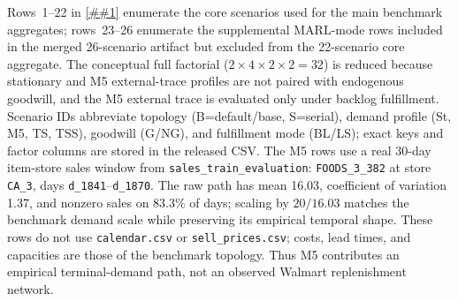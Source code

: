 \documentclass[10pt,a4paper]{article}
\providecommand{\Cref}[1]{\ref{##1}}
\begin{document}
Rows~1--22 in \Cref{tab:full_scenarios} enumerate the core scenarios used
for the main benchmark aggregates; rows~23--26 enumerate the supplemental
MARL-mode rows included in the merged 26-scenario artifact but excluded
from the 22-scenario core aggregate. The conceptual full factorial
($2 \times 4 \times 2 \times 2 = 32$) is reduced because stationary
and M5 external-trace profiles are not paired with endogenous goodwill, and the
M5 external trace is evaluated only under backlog fulfillment. Scenario
IDs abbreviate topology (B=default/base, S=serial), demand profile
(St, M5, TS, TSS), goodwill (G/NG), and fulfillment mode (BL/LS);
exact keys and factor columns are stored in the released CSV.
The M5 rows use a real 30-day item-store sales window from
\texttt{sales\_train\_evaluation}: \texttt{FOODS\_3\_382} at store
\texttt{CA\_3}, days \texttt{d\_1841}--\texttt{d\_1870}. The raw path
has mean 16.03, coefficient of variation 1.37, and nonzero sales on
83.3\% of days; scaling by $20/16.03$ matches the benchmark demand scale
while preserving its empirical temporal shape. These rows do not use
\texttt{calendar.csv} or \texttt{sell\_prices.csv}; costs, lead times,
and capacities are those of the benchmark topology. Thus M5 contributes
an empirical terminal-demand path, not an observed Walmart replenishment
network.
\end{document}

